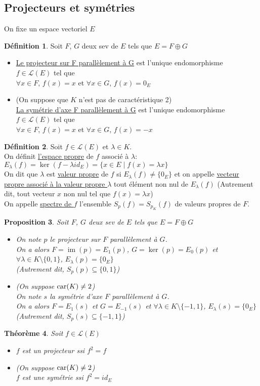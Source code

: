 \documentclass[10pt,a4paper]{article}
\theoremstyle{plain}
\newtheorem{proposition}{Proposition}[section]
\newtheorem{theorem}[proposition]{Théorème}
\theoremstyle{definition}
\newtheorem{definition}[proposition]{Définition}
\DeclareMathOperator{\im}{im}
\begin{document}
\pagebreak

\subsection{Projecteurs et symétries}
On fixe un espace vectoriel $E$
\begin{definition}
Soit $F$, $G$ deux sev de $E$ tels que $E = F \oplus G$
\begin{itemize}
\item \uline{Le projecteur sur F parallèlement à G} est l'unique endomorphisme $f \in \mathcal{L}(E)$ tel que \\
$\forall x \in F$, $f(x) = x$ et $\forall x \in G$, $f(x) = 0_E$
\item (On suppose que $K$ n'est pas de caractéristique 2) \\
\uline{La symétrie d'axe F parallèlement à G} est l'unique endomorphisme $f \in \mathcal{L}(E)$ tel que \\
$\forall x \in F$, $f(x) = x$ et $\forall x \in G$, $f(x) = -x$
\end{itemize}
\end{definition}
\begin{definition}
Soit $f \in \mathcal{L}(E)$ et $\lambda \in K$. \\
On définit \uline{l'espace propre} de $f$ associé à $\lambda$: $E_\lambda(f) = \ker(f - \lambda id_E) = \{ x \in E \mid f(x) = \lambda x \}$ \\
On dit que $\lambda$ est \uline{valeur propre} de $f$ si $E_\lambda(f) \neq \{ 0_E \}$ et on appelle \uline{vecteur propre associé à la valeur propre $\lambda$} tout élément non nul de $E_\lambda(f)$ (Autrement dit, tout vecteur $x$ non nul tel que $f(x) = \lambda x$) \\
On appelle \uline{spectre de $f$} l'ensemble $S_p(f) = S_{p_K}(f)$ de valeurs propres de $F$.
\end{definition}
\begin{proposition}
Soit $F$, $G$ deux sev de $E$ tels que $E = F \oplus G$
\begin{itemize}
\item On note $p$ le projecteur sur $F$ parallèlement à $G$. \\
On a alors $F = \im(p) = E_1(p)$, $G = \ker(p) = E_0(p)$ et $\forall \lambda \in K \setminus \{ 0, 1\}$, $E_\lambda(p) = \{ 0_E \}$ \\
(Autrement dit, $S_p(p) \subseteq \{ 0, 1 \}$)
\item (On suppose $\textnormal{car}(K) \neq 2$) \\
On note $s$ la symétrie d'axe $F$ parallèlement à $G$. \\
On a alors $F = E_1(s)$ et $G = E_{-1}(s)$ et $\forall \lambda \in K \setminus \{ -1, 1 \}$, $E_\lambda(s) = \{ 0_E \}$ \\
(Autrement dit, $S_p(s) \subseteq \{ -1, 1 \}$)
\end{itemize}
\end{proposition}
\begin{theorem}
Soit $f \in \mathcal{L}(E)$
\begin{itemize}
\item $f$ est un projecteur ssi $f^2 = f$
\item (On suppose $\textnormal{car}(K) \neq 2$) \\
$f$ est une symétrie ssi $f^2 = id_E$
\end{itemize}
\end{theorem}
\end{document}

